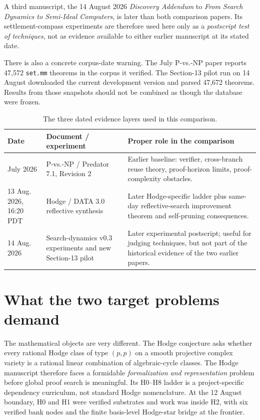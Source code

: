 \documentclass[11pt]{article}
\begin{document}
A third manuscript, the 14 August 2026 \emph{Discovery Addendum} to \emph{From Search Dynamics to Semi-Ideal Computers}, is later than both comparison papers.  Its settlement-compass experiments are therefore used here only as a \emph{postscript test of techniques}, not as evidence available to either earlier manuscript at its stated date.

There is also a concrete corpus-date warning.  The July P-vs.-NP paper reports 47,572 \texttt{set.mm} theorems in the corpus it verified.  The Section-13 pilot run on 14 August downloaded the current development version and parsed 47,672 theorems.  Results from those snapshots should not be combined as though the database were frozen.

\begin{table}[H]
\centering
\caption{The three dated evidence layers used in this comparison.}
\begin{tabularx}{\textwidth}{@{}p{}p{}X@{}}
\toprule
Date & Document / experiment & Proper role in the comparison \\
\midrule
July 2026 & P-vs.-NP / Predator 7.1, Revision 2 & Earlier baseline: verifier, cross-branch reuse theory, proof-horizon limits, proof-complexity obstacles. \\
13 Aug. 2026, 16:20 PDT & Hodge / DATA 3.0 reflective synthesis & Later Hodge-specific ladder plus same-day reflective-search improvement theorem and self-pruning consequences. \\
14 Aug. 2026 & Search-dynamics v0.3 experiments and new Section-13 pilot & Later experimental postscript; useful for judging techniques, but not part of the historical evidence of the two earlier papers. \\
\bottomrule
\end{tabularx}
\end{table}

\section{What the two target problems demand}

The mathematical objects are very different.  The Hodge conjecture asks whether every rational Hodge class of type \((p,p)\) on a smooth projective complex variety is a rational linear combination of algebraic-cycle classes.  The Hodge manuscript therefore faces a formidable \emph{formalization and representation} problem before global proof search is meaningful.  Its H0--H8 ladder is a project-specific dependency curriculum, not standard Hodge nomenclature.  At the 12 August boundary, H0 and H1 were verified substrates and work was inside H2, with six verified bank nodes and the finite basis-level Hodge-star bridge at the frontier.
\end{document}
